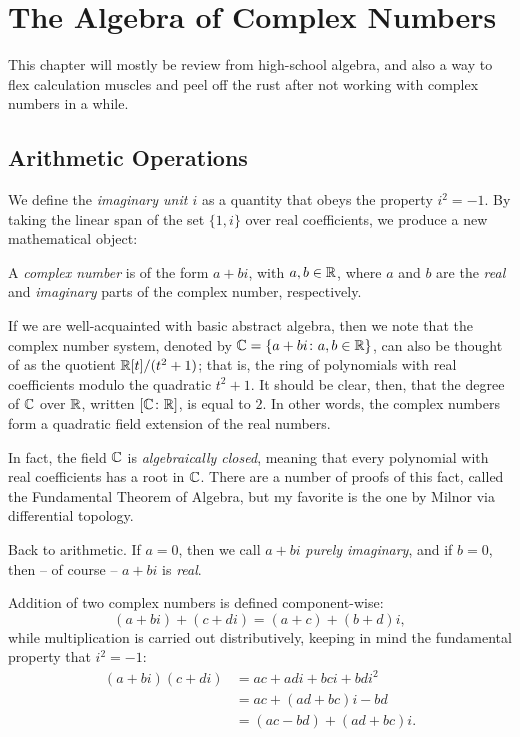 \chapter{The Algebra of Complex Numbers}
\label{chap:complex-algebra}

This chapter will mostly be review from high-school algebra, and also a way to flex calculation muscles and peel off the rust after not working with complex numbers in a while.

\section{Arithmetic Operations}
We define the \emph{imaginary unit $i$} as a quantity that obeys the property $i^2=-1$. By taking the linear span of the set $\{1,i\}$ over real coefficients, we produce a new mathematical object:

\begin{definition}
A \emph{complex number} is of the form $a+bi$, with $a,b \in \mathbb R$, where $a$ and $b$ are the \emph{real} and \emph{imaginary} parts of the complex number, respectively.
\end{definition}

If we are well-acquainted with basic abstract algebra, then we note that the complex number system, denoted by $\mathbb C=\{a+bi \colon a,b \in \mathbb R\}$, can also be thought of as the quotient $\mathbb R[t]/(t^2+1)$; that is, the ring of polynomials with real coefficients modulo the quadratic $t^2+1$. It should be clear, then, that the degree of $\mathbb C$ over $\mathbb R$, written $[\mathbb C \colon \mathbb R]$, is equal to $2$. In other words, the complex numbers form a quadratic field extension of the real numbers.

In fact, the field $\mathbb C$ is \textit{algebraically closed}, meaning that every polynomial with real coefficients has a root in $\mathbb C$. There are a number of proofs of this fact, called the Fundamental Theorem of Algebra, but my favorite is the one by Milnor via differential topology.

Back to arithmetic. If $a=0$, then we call $a+bi$ \emph{purely imaginary}, and if $b=0$, then -- of course -- $a+bi$ is \textit{real}.

Addition of two complex numbers is defined component-wise: $$(a+bi)+(c+di)=(a+c)+(b+d)i,$$ while multiplication is carried out distributively, keeping in mind the fundamental property that $i^2=-1$:
\begin{align*}
	(a+bi)(c+di) &=ac+adi+bci+bdi^2 \\
	&=ac+(ad+bc)i-bd \\
	&=(ac-bd)+(ad+bc)i.
\end{align*}

